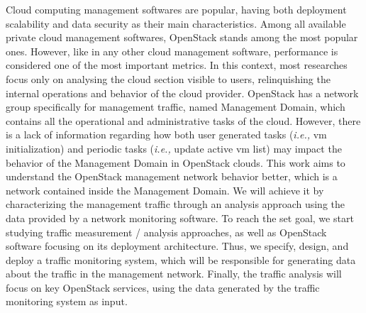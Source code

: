 Cloud computing management softwares are popular, having both deployment scalability and data security as their main characteristics.
%
Among all available private cloud management softwares, OpenStack stands among the most popular ones.
%
However, like in any other cloud management software, performance is considered one of the most important metrics. 
%
In this context, most researches focus only on analysing the cloud section visible to users, relinquishing the internal operations and behavior of the cloud provider.
%
OpenStack has a network group specifically for management traffic, named Management Domain, which contains all the operational and administrative tasks of the cloud.
%
However, there is a lack of information regarding how both user generated tasks (\textit{i.e., } \ac{vm} initialization) and periodic tasks (\textit{i.e.,} update active \ac{vm} list) may impact the behavior of the Management Domain in OpenStack clouds.
%
This work aims to understand the OpenStack management network behavior better, which is a network contained inside the Management Domain.
%
We will achieve it by characterizing the management traffic through an analysis approach using the data provided by a network monitoring software.
%
To reach the set goal, we start studying traffic measurement / analysis approaches, as well as OpenStack software focusing on its deployment architecture.
%
Thus, we specify, design, and deploy a traffic monitoring system, which will be responsible for generating data about the traffic in the management network.
%
Finally, the traffic analysis will focus on key OpenStack services, using the data generated by the traffic monitoring system as input.